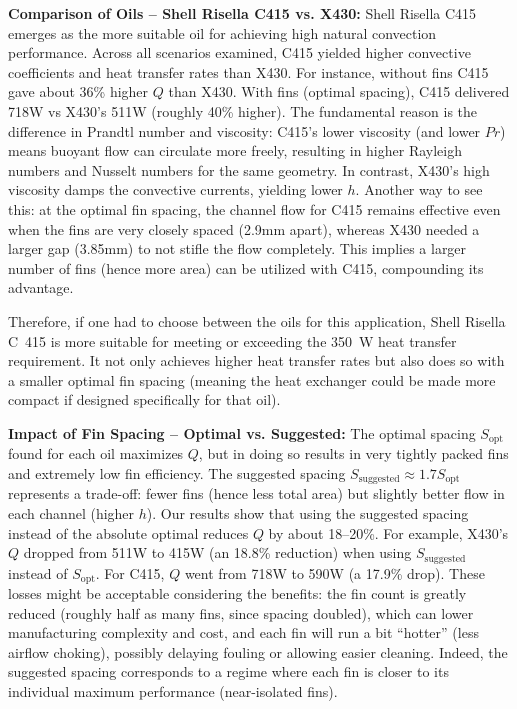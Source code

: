 \documentclass[12pt]{article}
\begin{document}
\textbf{Comparison of Oils – Shell Risella C415 vs. X430:} Shell Risella C415 emerges as the more suitable oil for achieving high natural convection performance. Across all scenarios examined, C415 yielded higher convective coefficients and heat transfer rates than X430. For instance, without fins C415 gave about 36\% higher $Q$ than X430. With fins (optimal spacing), C415 delivered 718W vs X430’s 511W (roughly 40\% higher). The fundamental reason is the difference in Prandtl number and viscosity: C415’s lower viscosity (and lower $Pr$) means buoyant flow can circulate more freely, resulting in higher Rayleigh numbers and Nusselt numbers for the same geometry. In contrast, X430’s high viscosity damps the convective currents, yielding lower $h$. Another way to see this: at the optimal fin spacing, the channel flow for C415 remains effective even when the fins are very closely spaced (2.9mm apart), whereas X430 needed a larger gap (3.85mm) to not stifle the flow completely. This implies a larger number of fins (hence more area) can be utilized with C415, compounding its advantage.

Therefore, if one had to choose between the oils for this application, Shell Risella C~415 is more suitable for meeting or exceeding the 350~W heat transfer requirement. It not only achieves higher heat transfer rates but also does so with a smaller optimal fin spacing (meaning the heat exchanger could be made more compact if designed specifically for that oil).

\textbf{Impact of Fin Spacing – Optimal vs. Suggested:} The optimal spacing $S_{\text{opt}}$ found for each oil maximizes $Q$, but in doing so results in very tightly packed fins and extremely low fin efficiency. The suggested spacing $S_{\text{suggested}} \approx 1.7 S_{\text{opt}}$ represents a trade-off: fewer fins (hence less total area) but slightly better flow in each channel (higher $h$). Our results show that using the suggested spacing instead of the absolute optimal reduces $Q$ by about 18–20\%. For example, X430’s $Q$ dropped from 511W to 415W (an 18.8\% reduction) when using $S_{\text{suggested}}$ instead of $S_{\text{opt}}$. For C415, $Q$ went from 718W to 590W (a 17.9\% drop). These losses might be acceptable considering the benefits: the fin count is greatly reduced (roughly half as many fins, since spacing doubled), which can lower manufacturing complexity and cost, and each fin will run a bit “hotter” (less airflow choking), possibly delaying fouling or allowing easier cleaning. Indeed, the suggested spacing corresponds to a regime where each fin is closer to its individual maximum performance (near-isolated fins).
\end{document}
